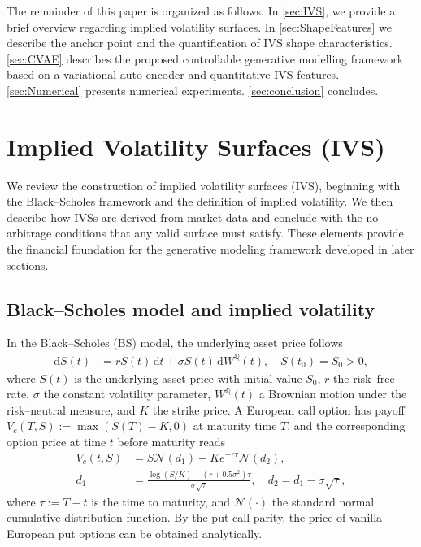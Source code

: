 \documentclass{article}
\begin{document}
The remainder of this paper is organized as follows. In \autoref{sec:IVS}, we provide a brief overview regarding implied volatility surfaces. In \autoref{sec:ShapeFeatures} we describe the anchor point and the quantification of IVS shape characteristics. \autoref{sec:CVAE} describes the proposed controllable generative modelling framework based on a variational auto-encoder and quantitative IVS features. \autoref{sec:Numerical} presents  numerical experiments. \autoref{sec:conclusion} concludes.


\section{Implied Volatility Surfaces (IVS)}\label{sec:IVS}

We review the construction of implied volatility surfaces (IVS), beginning with the 
Black--Scholes framework and the definition of implied volatility. We then describe how 
IVSs are derived from market data and conclude with the no-arbitrage conditions that any 
valid surface must satisfy. These elements provide the financial foundation for the 
generative modeling framework developed in later sections.

\subsection{Black--Scholes model and implied volatility}

In the Black--Scholes (BS) model, the underlying asset price follows
\begin{subequations}\label{eq:BS}
\begin{align}
\mathrm{d}S(t) &= rS(t)\,\mathrm{d}t + \sigma S(t)\,\mathrm{d}W^{\mathbb{Q}}(t),
\quad S(t_0) = S_0 > 0,
\end{align}
\end{subequations}
where $S(t)$ is the underlying asset price with initial value $S_0$, $r$ the 
risk--free rate, $\sigma$ the constant volatility parameter, $W^{\mathbb{Q}}(t)$ a 
Brownian motion under the risk--neutral measure, and $K$ the strike price. A European call option has  payoff $V_c(T, S) := \max(S(T)-K, 0)$ at maturity time $T$, and the corresponding option  price at time $t$ before maturity reads
\begin{subequations}\label{eq:analyticalBScall}
\begin{align}
V_c(t, S) &= S \mathcal{N}(d_1) - K e^{-r\tau} \mathcal{N}(d_2),\\
d_1 &= \frac{\log(S/K) + (r + 0.5\sigma^2)\tau}{\sigma\sqrt{\tau}}, 
\quad d_2 = d_1 - \sigma\sqrt{\tau},
\end{align}
\end{subequations}
where $\tau := T-t$ is the time to maturity, and $\mathcal{N}(\cdot)$ the standard 
normal cumulative distribution function. By the put-call parity, the price of vanilla European put options  can be obtained analytically. 
\end{document}
